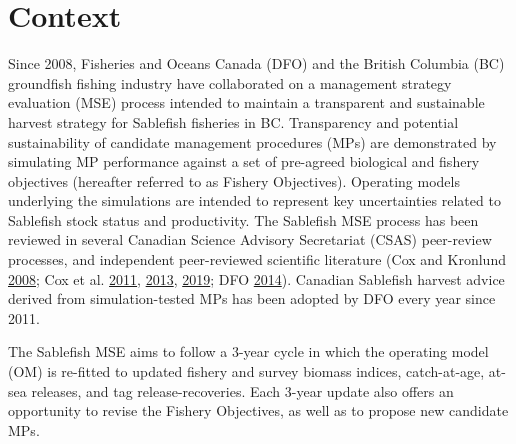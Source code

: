 \documentclass[11pt]{book}
\begin{document}
\MakeFirstPage

\hypertarget{context}{%
\section{Context}\label{context}}

Since 2008, Fisheries and Oceans Canada (DFO) and the British Columbia (BC) groundfish fishing industry have collaborated on a management strategy evaluation (MSE) process intended to maintain a transparent and sustainable harvest strategy for Sablefish fisheries in BC. Transparency and potential sustainability of candidate management procedures (MPs) are demonstrated by simulating MP performance against a set of pre-agreed biological and fishery objectives (hereafter referred to as Fishery Objectives). Operating models underlying the simulations are intended to represent key uncertainties related to Sablefish stock status and productivity. The Sablefish MSE process has been reviewed in several Canadian Science Advisory Secretariat (CSAS) peer-review processes, and independent peer-reviewed scientific literature (Cox and Kronlund \protect\hyperlink{ref-cox2008practical}{2008}; Cox et al. \protect\hyperlink{ref-cox2011management}{2011}, \protect\hyperlink{ref-cox2013roles}{2013}, \protect\hyperlink{ref-cox2019evaluating}{2019}; DFO \protect\hyperlink{ref-dfo2014performanc}{2014}). Canadian Sablefish harvest advice derived from simulation-tested MPs has been adopted by DFO every year since 2011.

The Sablefish MSE aims to follow a 3-year cycle in which the operating model (OM) is re-fitted to updated fishery and survey biomass indices, catch-at-age, at-sea releases, and tag release-recoveries. Each 3-year update also offers an opportunity to revise the Fishery Objectives, as well as to propose new candidate MPs.
\end{document}
